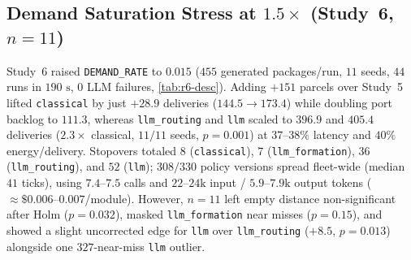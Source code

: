 \documentclass[11pt,a4paper,oneside]{report}
\begin{document}
\subsection{Demand Saturation Stress at \texorpdfstring{$1.5\times$}{1.5x} (Study~6, \texorpdfstring{$n=11$}{n=11})}
Study~6 raised \texttt{DEMAND\_RATE} to $0.015$ ($455$ generated packages/run, $11$ seeds, $44$ runs in $190\text{ s}$, $0$ LLM failures, \autoref{tab:r6-desc}). Adding $+151$ parcels over Study~5 lifted \texttt{classical} by just $+28.9$ deliveries ($144.5 \to 173.4$) while doubling port backlog to $111.3$, whereas \texttt{llm\_routing} and \texttt{llm} scaled to $396.9$ and $405.4$ deliveries ($2.3\times$ classical, $11/11$ seeds, $p=0.001$) at $37\text{--}38\%$ latency and $40\%$ energy/delivery. Stopovers totaled $8$ (\texttt{classical}), $7$ (\texttt{llm\_formation}), $36$ (\texttt{llm\_routing}), and $52$ (\texttt{llm}); $308/330$ policy versions spread fleet-wide (median $41$ ticks), using $7.4\text{--}7.5$ calls and $22\text{--}24\text{k}$ input / $5.9\text{--}7.9\text{k}$ output tokens ($\approx \$0.006\text{--}0.007$/module). However, $n=11$ left empty distance non-significant after Holm ($p=0.032$), masked \texttt{llm\_formation} near misses ($p=0.15$), and showed a slight uncorrected edge for \texttt{llm} over \texttt{llm\_routing} ($+8.5$, $p=0.013$) alongside one $327$-near-miss \texttt{llm} outlier.

\begin{table}[H]
\centering
\caption[Descriptive summary at 1.5x demand (Study 6)]{Descriptive performance summary at $1.5\times$ demand across $4$ arms $\times$ $11$ seeds in Study~6.}
\label{tab:r6-desc}
\end{table}
\end{document}
